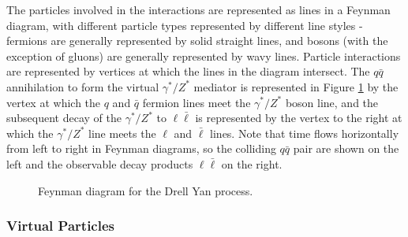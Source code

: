 The particles involved in the interactions are represented as lines in a Feynman diagram, with different particle types represented by different line styles - fermions are generally represented by solid straight lines, and bosons (with the exception of gluons) are generally represented by wavy lines. Particle interactions are represented by vertices at which the lines in the diagram intersect. The \(q\bar{q}\) annihilation to form the virtual \(\gamma^{*}/Z^{*}\) mediator is represented in Figure \ref{fig:drell_yan} by the vertex at which the \(q\) and \(\bar{q}\) fermion lines meet the \(\gamma^{*}/Z^{*}\) boson line, and the subsequent decay of the  \(\gamma^{*}/Z^{*}\) to \(\ell\bar{\ell}\) is represented by the vertex to the right at which the \(\gamma^{*}/Z^{*}\) line meets the \(\ell\) and \(\bar{\ell}\) lines. Note that time flows horizontally from left to right in Feynman diagrams, so the colliding \(q\bar{q}\) pair are shown on the left and the observable decay products \(\ell\bar{\ell}\) on the right.

\begin{figure}[hp]
	\centering
	\caption{Feynman diagram for the Drell Yan process.}
	\label{fig:drell_yan}
\end{figure}

\subsubsection{Virtual Particles}
\label{sec:virtual_particles}

